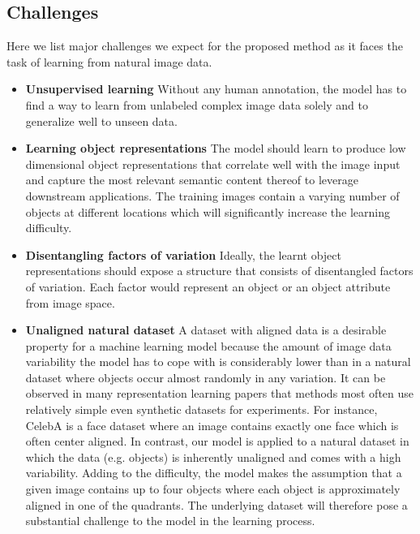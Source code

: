 \documentclass[12pt,a4paper]{article}
\begin{document}
\subsection{Challenges}
Here we list major challenges we expect for the proposed method as it faces the task of learning from natural image data.
\begin{itemize}
  \item \textbf{Unsupervised learning} Without any human annotation, the model has to find a way to learn from unlabeled complex image data solely and to generalize well to unseen data.
  \item \textbf{Learning object representations} The model should learn to produce low dimensional object representations that correlate well with the image input and capture the most relevant semantic content thereof to leverage downstream applications. The training images contain a varying number of objects at different locations which will significantly increase the learning difficulty.
  \item \textbf{Disentangling factors of variation} Ideally, the learnt object representations should expose a structure that consists of disentangled factors of variation. Each factor would represent an object or an object attribute from image space.
  \item \textbf{Unaligned natural dataset} A dataset with aligned data is a desirable property for a machine learning model because the amount of image data variability the model has to cope with is considerably lower than in a natural dataset where objects occur almost randomly in any variation. It can be observed in many representation learning papers that methods most often use relatively simple even synthetic datasets for experiments. For instance, CelebA is a face dataset where an image contains exactly one face which is often center aligned. In contrast, our model is applied to a natural dataset in which the data (e.g. objects) is inherently unaligned and comes with a high variability. Adding to the difficulty, the model makes the assumption that a given image contains up to four objects where each object is approximately aligned in one of the quadrants. The underlying dataset will therefore pose a substantial challenge to the model in the learning process.
\end{itemize}


\newpage
\end{document}
